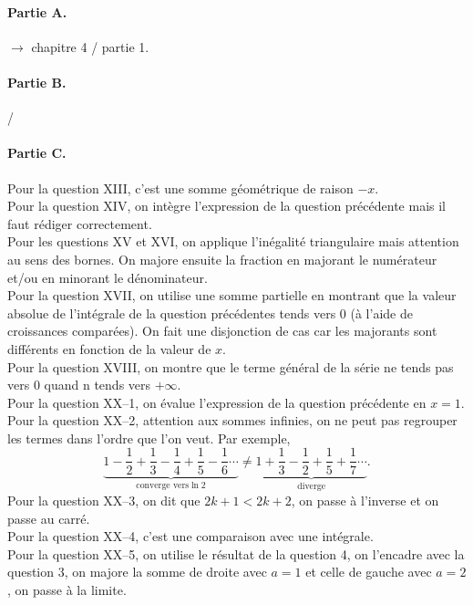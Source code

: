 \documentclass[a4paper]{report}
\begin{document}
	\paragraph{Partie A.} $\rightarrow$ chapitre 4 / partie 1.\\
	\paragraph{Partie B.} /\\
	\paragraph{Partie C.}
	Pour la question XIII, c'est une somme géométrique de raison $-x$.\\
	Pour la question XIV, on intègre l'expression de la question précédente mais il faut rédiger correctement.\\
	Pour les questions XV et XVI, on applique l'inégalité triangulaire mais attention au sens des bornes. On majore ensuite la fraction en majorant le numérateur et/ou en minorant le dénominateur.\\
	Pour la question XVII, on utilise une somme partielle en montrant que la valeur absolue de l'intégrale de la question précédentes tends vers 0 (à l'aide de croissances comparées). On fait une disjonction de cas car les majorants sont différents en fonction de la valeur de $x$.\\
	Pour la question XVIII, on montre que le terme général de la série ne tends pas vers 0 quand n tends vers $+\infty$.\\
	Pour la question XX--1, on évalue l'expression de la question précédente en $x = 1$.\\
	Pour la question XX--2, attention aux sommes infinies, on ne peut pas regrouper les termes dans l'ordre que l'on veut. Par exemple, \[
		\underbrace{1 - \frac{1}{2} + \frac{1}{3} - \frac{1}{4} + \frac{1}{5}-\frac{1}{6} \cdots}_{\text{converge vers} \ln 2} \neq \underbrace{1 + \frac{1}{3} - \frac{1}{2} + \frac{1}{5} + \frac{1}{7} \cdots}_{\text{diverge}}.
	\]
	Pour la question XX--3, on dit que $2k + 1 < 2k+2$, on passe à l'inverse et on passe au carré.\\
	Pour la question XX--4, c'est une comparaison avec une intégrale.\\
	Pour la question XX--5, on utilise le résultat de la question 4, on l'encadre avec la question 3, on majore la somme de droite avec $a = 1$ et celle de gauche avec $a = 2$, on passe à la limite.\\
\end{document}
